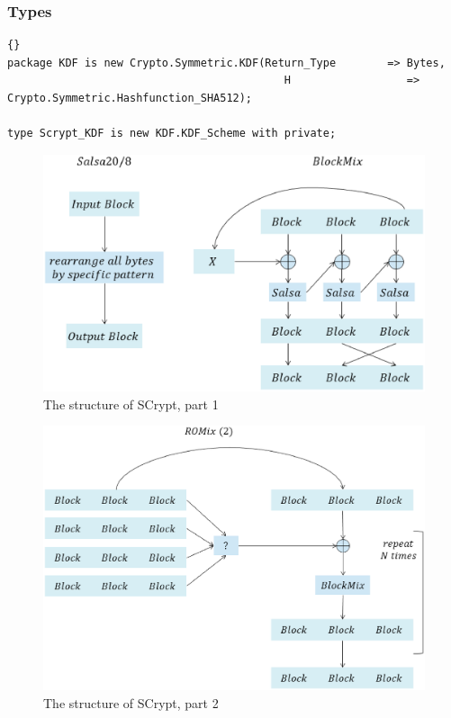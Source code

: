 \subsubsection*{Types}
\begin{lstlisting}{}
package KDF is new Crypto.Symmetric.KDF(Return_Type        => Bytes,
                                           H                  => Crypto.Symmetric.Hashfunction_SHA512);

type Scrypt_KDF is new KDF.KDF_Scheme with private;

\end{lstlisting}

\begin{figure}[ht!]
\centering
\includegraphics[width=150mm]{./images/Scrypta}
\caption{The structure of SCrypt, part 1}
\end{figure}

\begin{figure}[ht!]
\centering
\includegraphics[width=150mm]{./images/Scryptb}
\caption{The structure of SCrypt, part 2}
\end{figure}

